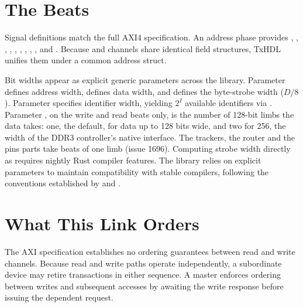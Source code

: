 \documentclass[journal,9pt]{IEEEtran}
\newcommand{\axipart}[3]{%
}
\begin{document}




\section{The Beats}
\label{sec:a-beats}

Signal definitions match the full AXI4 specification. An address phase
provides , , , , ,
, , , , and .
Because  and  channels share identical field structures,
TxHDL unifies them under a common address struct.

\axipart{beats}{Channel beat definitions for AXI4.}{lst:a-beats}

Bit widths appear as explicit generic parameters across the library.
Parameter  defines address width,  defines data width, and
 defines the byte-strobe width (\(D/8\)). Parameter 
specifies identifier width, yielding \(2^I\) available identifiers via
. Parameter , on the write and read beats only, is
the number of 128-bit limbs the data takes: one, the default, for data
up to 128 bits wide, and two for 256, the width of the DDR3
controller's native interface. The trackers, the router and the pins
parts take beats of one limb (issue 1696). Computing strobe width directly as  requires
nightly Rust compiler features. The library relies on explicit parameters
to maintain compatibility with stable compilers, following the conventions
established by  and .

\section{What This Link Orders}
\label{sec:a-order}

The AXI specification establishes no ordering guarantees between read and
write channels. Because read and write paths operate independently, a
subordinate device may retire transactions in either sequence. A master
enforces ordering between writes and subsequent accesses by awaiting the
write response before issuing the dependent request.
\end{document}
